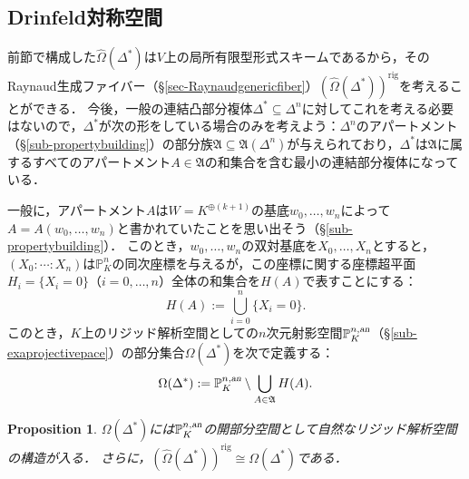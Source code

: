 \documentclass[a4paper,12pt, dvipdfmx]{jsbook}
\def\P{\mathbb{P}}
\def\rig{\mathop{\mathrm{rig}}\nolimits}
\def\an{\textsl{an}}
\theoremstyle{plain}
\newtheorem{prop}[thm]{\bfseries Proposition}
\theoremstyle{definition}
\begin{document}
\subsection{Drinfeld対称空間}\label{sub-Drinfeldspace}
前節で構成した$\widehat{\Omega}(\Delta^{\ast})$は$V$上の局所有限型形式スキームであるから，そのRaynaud生成ファイバー（\S\ref{sec-Raynaudgenericfiber}）$(\widehat{\Omega}(\Delta^{\ast}))^{\rig}$を考えることができる．
今後，一般の連結凸部分複体$\Delta^{\ast}\subseteq\Delta^n$に対してこれを考える必要はないので，$\Delta^{\ast}$が次の形をしている場合のみを考えよう：$\Delta^n$のアパートメント（\S\ref{sub-propertybuilding}）の部分族$\mathfrak{A}\subseteq\mathfrak{A}(\Delta^n)$が与えられており，$\Delta^{\ast}$は$\mathfrak{A}$に属するすべてのアパートメント$A\in\mathfrak{A}$の和集合を含む最小の連結部分複体になっている．

一般に，アパートメント$A$は$W=K^{\oplus (k+1)}$の基底$w_0,\ldots,w_n$によって$A=A(w_0,\ldots,w_n)$と書かれていたことを思い出そう（\S\ref{sub-propertybuilding}）．
このとき，$w_0,\ldots,w_n$の双対基底を$X_0,\ldots,X_n$とすると，$(X_0\colon\!\cdots\colon\! X_n)$は$\P^n_K$の同次座標を与えるが，この座標に関する座標超平面$H_i=\{X_i=0\}$（$i=0,\ldots,n$）全体の和集合を$H(A)$で表すことにする：
$$
H(A):=\bigcup_{i=0}^n\{X_i=0\}.
$$
このとき，$K$上のリジッド解析空間としての$n$次元射影空間$\P^{n,\an}_K$（\S\ref{sub-exaprojectivepace}）の部分集合$\Omega(\Delta^{\ast})$を次で定義する：
$$
\Omega(\Delta^{\ast}):=\P^{n,\an}_K\setminus\bigcup_{A\in\mathfrak{A}}H(A).
$$
\begin{prop}\label{prop-drinfeldraynaud}{\rm 
$\Omega(\Delta^{\ast})$には$\P^{n,\an}_K$の開部分空間として自然なリジッド解析空間の構造が入る．
さらに，$(\widehat{\Omega}(\Delta^{\ast}))^{\rig}\cong\Omega(\Delta^{\ast})$である．}
\end{prop}
\end{document}
